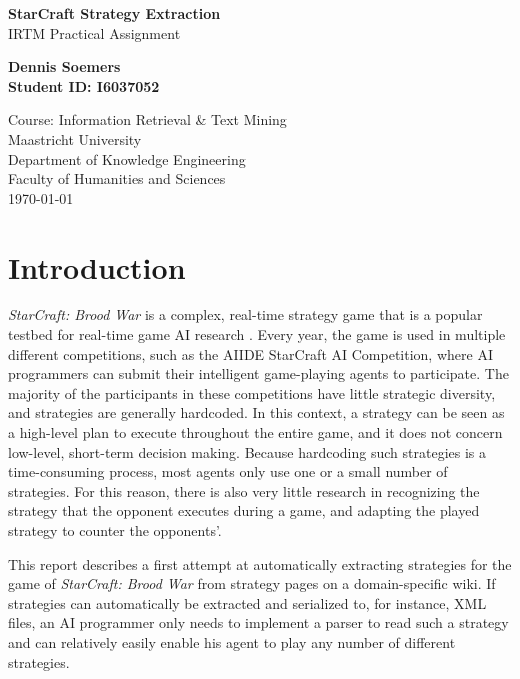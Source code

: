 \documentclass[]{article}
\begin{document}
\begin{titlepage}
\begin{center}
{\huge \bfseries StarCraft Strategy Extraction} \\
{\Large IRTM Practical Assignment}

\vspace{1cm}
{\Large \bfseries Dennis Soemers} \\
{\Large \bfseries Student ID: I6037052}

\vspace{1.5cm}
Course: Information Retrieval \& Text Mining \\
Maastricht University \\
Department of Knowledge Engineering\\
Faculty of Humanities and Sciences\\

\vspace{3cm}
{\Large \today}

\end{center}
\end{titlepage}

\section{Introduction}
\emph{StarCraft: Brood War} is a complex, real-time strategy game that is a popular testbed for real-time game AI research \cite{Survey2013}. Every year, the game is used in multiple different competitions, such as the AIIDE StarCraft AI Competition, where AI programmers can submit their intelligent game-playing agents to participate. The majority of the participants in these competitions have little strategic diversity, and strategies are generally hardcoded. In this context, a strategy can be seen as a high-level plan to execute throughout the entire game, and it does not concern low-level, short-term decision making. Because hardcoding such strategies is a time-consuming process, most agents only use one or a small number of strategies. For this reason, there is also very little research in recognizing the strategy that the opponent executes during a game, and adapting the played strategy to counter the opponents'.

This report describes a first attempt at automatically extracting strategies for the game of \emph{StarCraft: Brood War} from strategy pages on a domain-specific wiki. If strategies can automatically be extracted and serialized to, for instance, XML files, an AI programmer only needs to implement a parser to read such a strategy and can relatively easily enable his agent to play any number of different strategies.
\end{document}
